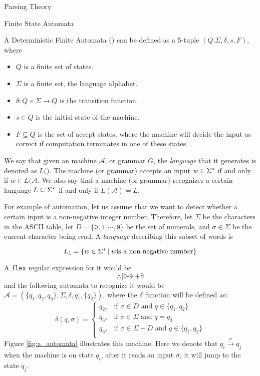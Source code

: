 \begin{section}{Parsing Theory}
\begin{subsection}{Finite State Automata}
\begin{definition}
A Deterministic Finite Automata () can be defined as a 5-tuple
$(Q. \Sigma, \delta, s, F)$, where
\begin{itemize}

\item $Q$ is a finite set of states.
\item $\Sigma$ is a finite set, the language alphabet.
\item $\delta:Q\times\Sigma \longrightarrow Q$ is the transition function.
\item $s \in Q$ is the initial state of the machine.
\item $F \subseteq Q$ is the set of accept states, where the machine will
decide the input as correct if computation terminates in one of these
states.
\end{itemize}
\end{definition}

We say that given an machine $\mathcal{A}$, or grammar $G$, the \textit{language}
that it generates is denoted as $L(\mathcal)$. The machine (or grammar) accepts an input
$w \in \Sigma^*$ if and only if $w \in L(\mathcal{A}$. We also say that a machine
(or grammar) recognizes a certain language $L \subseteq \Sigma^*$ if and only if
$L(\mathcal{A}) = L$.

For example of automation, let us assume that we want to detect whether a
certain input is a non-negative integer number. Therefore, let $\Sigma$ be the
characters in the ASCII table, let $D = \{\texttt{0}, \texttt{1}, \cdots,
\texttt{9}\}$ be the set of numerals, and $\sigma \in \Sigma$ be the current
character being read. A \textit{language} describing this subset of words
is

$$ L_1 = \{w \in \Sigma^*\,|\;w \text{is a non-negative number}\}$$

A \texttt{flex} regular expression for it would be
$$\land\texttt{[0-9]+\$}$$
and the following automata to recognize it would be
$\mathcal{A} = (\{q_1, q_2, q_3\}, \Sigma, \delta, q_1, \{q_2\})$, where
the $\delta$ function will be defined as:
	\[
		\delta(q, \sigma) = \begin{cases}
		  q_2,& \text{if } \sigma \in D \text{ and } q \in \{q_1, q_2\} \\
		  q_3,& \text{if } \sigma \in \Sigma \text{ and } q = q_3 \\
		  q_3,& \text{if } \sigma \in \Sigma - D \text{ and } q \in \{q_1, q_2\} \\
		\end{cases} \nonumber
	\]
Figure \ref{fig:a_automata} illustrates this machine. Here we denote that
$q_i \overset{\sigma}{\longrightarrow} q_j$ when the machine is on state
$q_i$, after it reads an input $\sigma$, it will jump to the state $q_j$.


\end{subsection}
\end{section}
